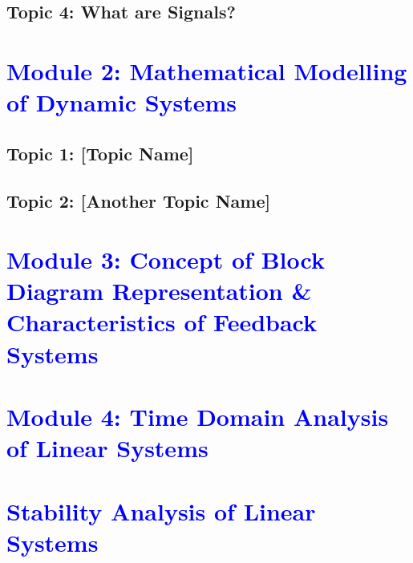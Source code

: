 \documentclass[12pt]{report}
\begin{document}
\section{Topic 4: What are Signals?}

\clearpage
\chapter{\textcolor{blue}{Module 2: Mathematical Modelling of Dynamic Systems}}

\section{Topic 1: [Topic Name]}

\section{Topic 2: [Another Topic Name]}

\clearpage

\chapter{\textcolor{blue}{Module 3: Concept of Block Diagram Representation \& Characteristics of Feedback Systems}}

\clearpage

\chapter{\textcolor{blue}{Module 4: Time Domain Analysis of Linear Systems}}
\clearpage

\chapter{\textcolor{blue}{Stability Analysis of Linear Systems}}
\end{document}
